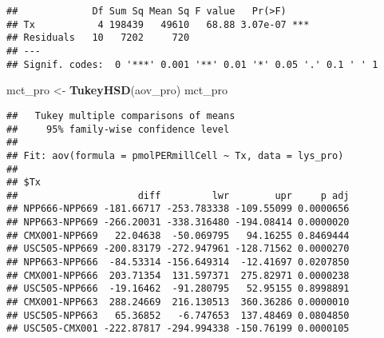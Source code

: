\documentclass[]{article}
\newenvironment{Shaded}{\begin{snugshade}}{\end{snugshade}}
\newcommand{\KeywordTok}[1]{\textcolor[rgb]{0.13,0.29,0.53}{\textbf{#1}}}
\newcommand{\NormalTok}[1]{#1}
\newcommand{\StringTok}[1]{\textcolor[rgb]{0.31,0.60,0.02}{#1}}
\begin{document}
\begin{verbatim}
##             Df Sum Sq Mean Sq F value   Pr(>F)    
## Tx           4 198439   49610   68.88 3.07e-07 ***
## Residuals   10   7202     720                     
## ---
## Signif. codes:  0 '***' 0.001 '**' 0.01 '*' 0.05 '.' 0.1 ' ' 1
\end{verbatim}

\begin{Shaded}
\begin{Highlighting}[]
\NormalTok{mct_pro <-}\StringTok{ }\KeywordTok{TukeyHSD}\NormalTok{(aov_pro)}
\NormalTok{mct_pro}
\end{Highlighting}
\end{Shaded}

\begin{verbatim}
##   Tukey multiple comparisons of means
##     95% family-wise confidence level
## 
## Fit: aov(formula = pmolPERmillCell ~ Tx, data = lys_pro)
## 
## $Tx
##                     diff         lwr        upr     p adj
## NPP666-NPP669 -181.66717 -253.783338 -109.55099 0.0000656
## NPP663-NPP669 -266.20031 -338.316480 -194.08414 0.0000020
## CMX001-NPP669   22.04638  -50.069795   94.16255 0.8469444
## USC505-NPP669 -200.83179 -272.947961 -128.71562 0.0000270
## NPP663-NPP666  -84.53314 -156.649314  -12.41697 0.0207850
## CMX001-NPP666  203.71354  131.597371  275.82971 0.0000238
## USC505-NPP666  -19.16462  -91.280795   52.95155 0.8998891
## CMX001-NPP663  288.24669  216.130513  360.36286 0.0000010
## USC505-NPP663   65.36852   -6.747653  137.48469 0.0804850
## USC505-CMX001 -222.87817 -294.994338 -150.76199 0.0000105
\end{verbatim}
\end{document}
